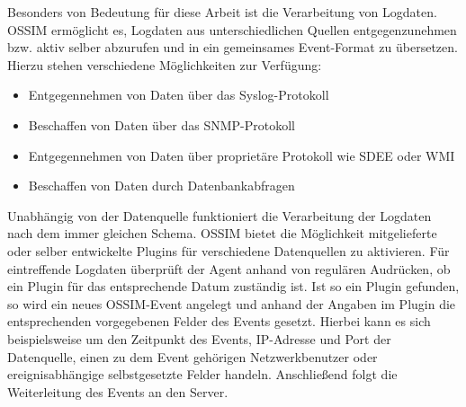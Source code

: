 \label{subsec_state_siem_parsing}

Besonders von Bedeutung für diese Arbeit ist die Verarbeitung von Logdaten. OSSIM ermöglicht es, Logdaten aus unterschiedlichen Quellen entgegenzunehmen bzw. aktiv selber abzurufen und in ein gemeinsames Event-Format zu übersetzen. Hierzu stehen verschiedene Möglichkeiten zur Verfügung:

\begin{itemize}
  \item Entgegennehmen von Daten über das Syslog-Protokoll
  \item Beschaffen von Daten über das SNMP-Protokoll
  \item Entgegennehmen von Daten über proprietäre Protokoll wie SDEE oder WMI
  \item Beschaffen von Daten durch Datenbankabfragen 
\end{itemize}

Unabhängig von der Datenquelle funktioniert die Verarbeitung der Logdaten nach dem immer gleichen Schema. OSSIM bietet die Möglichkeit mitgelieferte oder selber entwickelte Plugins für verschiedene Datenquellen zu aktivieren. Für eintreffende Logdaten überprüft der Agent anhand von regulären Audrücken, ob ein Plugin für das entsprechende Datum zuständig ist. Ist so ein Plugin gefunden, so wird ein neues OSSIM-Event angelegt und anhand der Angaben im Plugin die entsprechenden vorgegebenen Felder des Events gesetzt. Hierbei kann es sich beispielsweise um den Zeitpunkt des Events, IP-Adresse und Port der Datenquelle, einen zu dem Event gehörigen Netzwerkbenutzer oder ereignisabhängige selbstgesetzte Felder handeln. Anschließend folgt die Weiterleitung des Events an den Server.
